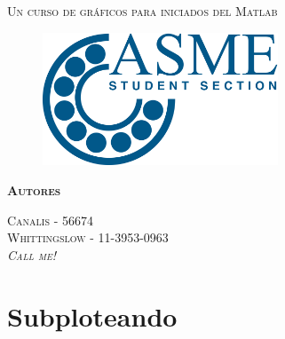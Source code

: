 \documentclass[11pt, a4paper,titlepage]{article}
\begin{document}
\begin{titlepage} %
\centering
{\scshape\Huge Un curso de gráficos para iniciados del Matlab\par}
\vspace{1cm}
\begin{figure}[h]
\centering
\includegraphics[width=7cm]{logo/asme.png}
\end{figure}
\vspace{2cm}
{\scshape\Large\textbf{Autores} \par}
\medskip %
 \textsc{\large Canalis - 56674 \\ Whittingslow - 11-3953-0963\\ \textit{{\tiny Call me!}} }

\end{titlepage} %
\section{Subploteando}
\end{document}
